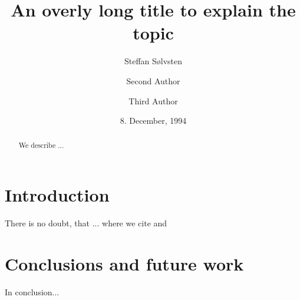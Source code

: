 \documentclass[a4, english, twoside, twocolumn]{article}
\begin{document}
\title{An overly long title to explain the topic}

\author{Steffan Sølvsten}

\author{Second Author}
\author{Third Author}

\date{8. December, 1994}

\maketitle

\begin{abstract}
  We describe ...
\end{abstract}

\section{Introduction} \label{sec:introduction}
There is no doubt, that ... where we cite \cite{doe10a} \cite{doe10b} and \cite{website}

\section{Conclusions and future work} \label{sec:conclusions}
In conclusion...

\clearpage \onecolumn
\printbibliography
\end{document}
